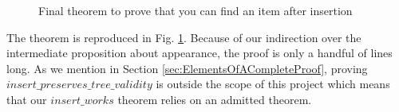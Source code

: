 \begin{figure}
  
  \caption{Final theorem to prove that you can find an item after insertion}
  \label{fig:insert_works}
\end{figure}

The theorem is reproduced in Fig. \ref{fig:insert_works}. Because of our indirection over the intermediate proposition about appearance, the proof is only a handful of lines long. As we mention in Section \ref{sec:ElementsOfACompleteProof}, proving $insert\_preserves\_tree\_validity$ is outside the scope of this project which means that our $insert\_works$ theorem relies on an admitted theorem. 
